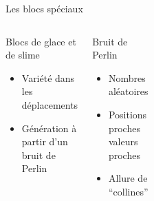 \documentclass{beamer}
\begin{document}
{\begin{frame}{Les blocs spéciaux}
    \begin{columns}
        \begin{block}{Blocs de glace et de slime}
            \begin{itemize}
                \item[\bullet] Variété dans les déplacements
                \item[\bullet] Génération à partir d'un bruit de Perlin
            \end{itemize}
        \end{block}
        \begin{block}{Bruit de Perlin}
            \begin{itemize}
                \item[\bullet] Nombres aléatoires
                \item[\bullet] Positions proches \eq valeurs proches
                \item[\bullet] Allure de ``collines''
            \end{itemize}
        \end{block}
        \begin{figure}
            \centering
            \includegraphics[width=0.4\textwidth]{perlin_noise_example}
        \end{figure}
        \begin{figure}
            \centering
            \includegraphics[width=1.0\textwidth]{perlin_noise_gradient}
        \end{figure}
        \begin{figure}

\end{figure}
\end{columns}
\end{frame}}
\end{document}
